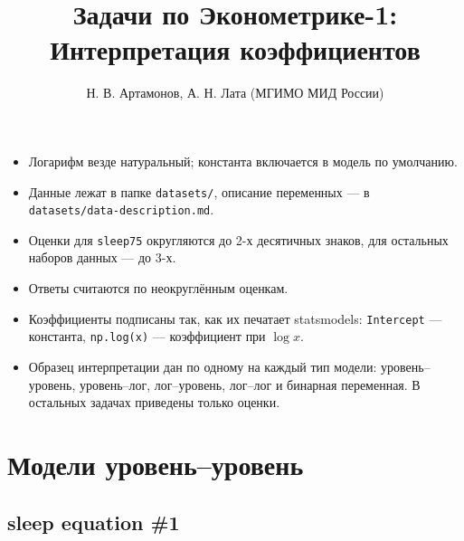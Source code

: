 \documentclass[
  russian,
]{article}
\title{Задачи по Эконометрике-1: Интерпретация коэффициентов}
\author{Н. В. Артамонов, А. Н. Лата (МГИМО МИД России)}
\date{}
\providecommand{\tightlist}{%
  \setlength{\itemsep}{0pt}\setlength{\parskip}{0pt}}
\renewcommand*\contentsname{Содержание}
\newcommand\contentsname{Содержание}
\begin{document}
\maketitle

\renewcommand*\contentsname{Содержание}
{
\setcounter{tocdepth}{3}
\tableofcontents
}

\begin{tcolorbox}[enhanced jigsaw, arc=.35mm, bottomrule=.15mm, bottomtitle=1mm, breakable, colback=white, colbacktitle=quarto-callout-important-color!10!white, colframe=quarto-callout-important-color-frame, coltitle=black, left=2mm, leftrule=.75mm, opacityback=0, opacitybacktitle=0.6, rightrule=.15mm, title=\textcolor{quarto-callout-important-color}{\faExclamation}\hspace{0.5em}{Важно}, titlerule=0mm, toprule=.15mm, toptitle=1mm]

\begin{itemize}
\tightlist
\item
  Логарифм везде натуральный; константа включается в модель по
  умолчанию.
\item
  Данные лежат в папке \texttt{datasets/}, описание переменных --- в
  \texttt{datasets/data-description.md}.
\item
  Оценки для \texttt{sleep75} округляются до 2-х десятичных знаков, для
  остальных наборов данных --- до 3-х.
\item
  Ответы считаются по неокруглённым оценкам.
\item
  Коэффициенты подписаны так, как их печатает statsmodels:
  \texttt{Intercept} --- константа, \texttt{np.log(x)} --- коэффициент
  при \(\log x\).
\item
  Образец интерпретации дан по одному на каждый тип модели:
  уровень--уровень, уровень--лог, лог--уровень, лог--лог и бинарная
  переменная. В остальных задачах приведены только оценки.
\end{itemize}

\end{tcolorbox}

\section{Модели
уровень--уровень}\label{ux43cux43eux434ux435ux43bux438-ux443ux440ux43eux432ux435ux43dux44cux443ux440ux43eux432ux435ux43dux44c}

\subsection{sleep equation \#1}\label{sleep-equation-1}
\end{document}
